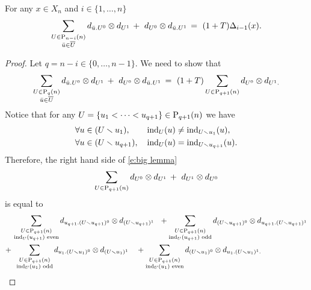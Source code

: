 \begin{lemma} \label{l:big lemma}  
	For any $x \in X_n$ and $i \in \{1, \dots, n\}$
	\begin{equation}
	\sum_{\substack{U \in \P_{n-i}(n) \\ \bu \in \overline{U}}} d_{\bu.U^0} \otimes d_{U^1}\, +\ d_{U^0} \otimes d_{\bu.U^1}\, = \
	(1+T) \Delta_{i-1}(x).
	\end{equation}
\end{lemma}

\begin{proof}
	Let $q = n-i \in \{0, \dots, n-1\}$.
	We need to show that
	\begin{equation} \label{e:big lemma}
	\sum_{\substack{U \in \P_{q}(n) \\ \bu \in \overline{U}}} d_{\bu.U^0} \otimes d_{U^1}\, +\ d_{U^0} \otimes d_{\bu.U^1}\, = \
	(1+T) \sum_{U \in \P_{q+1}(n)} d_{U^0} \otimes d_{U^1.}
	\end{equation}
	Notice that for any $U = \{u_1 < \cdots < u_{q+1}\} \in \P_{q+1}(n)$ we have
	\begin{align*}
	& \forall u \in (U \sm u_1), \qquad \ind_{U}(u) \neq \ind_{U \sm u_1}(u), \\
	& \forall u \in (U \sm u_{q+1}), \quad \ind_{U}(u) = \ind_{U \sm u_{q+1}}(u).
	\end{align*}
	Therefore, the right hand side of \eqref{e:big lemma}
	\begin{equation} \label{e:big lemma rhs}
	\sum_{U \in \P_{q+1}(n)} d_{U^0} \otimes d_{U^1}\, +\ d_{U^1} \otimes d_{U^0}
	\end{equation}
	is equal to
	\begin{equation} \label{e:big lemma rhs w/o endpoints}
	\begin{split}
	&\, \sum_{\substack{U \in \P_{q+1}(n) \\ \ind_U(u_{q+1}) \text{ even}}}
	d_{u_{q+1}.(U \sm u_{q+1})^0} \otimes d_{(U \sm u_{q+1})^1}\ \ + 
	\sum_{\substack{U \in \P_{q+1}(n) \\ \ind_U(u_{q+1}) \text{ odd}}}
	d_{(U \sm u_{q+1})^0} \otimes d_{u_{q+1}.(U \sm u_{q+1})^1} \\ +
	&\ \,\sum_{\substack{U \in \P_{q+1}(n) \\ \ind_U(u_1) \text{ odd}}} d_{u_1.(U \sm u_1)^0} \otimes d_{(U\sm u_1)^1} \quad +
	\sum_{\substack{U \in \P_{q+1}(n) \\ \ind_U(u_1) \text{ even}}} d_{(U \sm u_1)^0} \otimes d_{u_1.(U\sm u_1)^1.}
	\end{split}
	\end{equation}
	

\end{proof}
